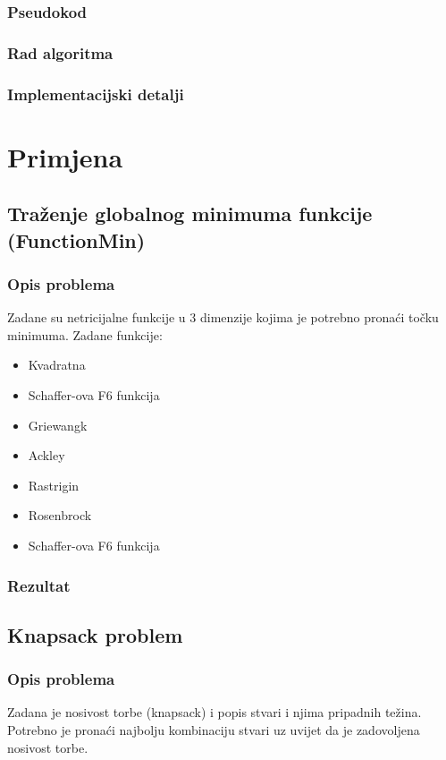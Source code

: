\documentclass[times, utf8, zavrsni]{fer}
\begin{document}
\subsection{Pseudokod}
\subsection{Rad algoritma}
\subsection{Implementacijski detalji}


\newpage

\chapter{Primjena}
\section{Traženje globalnog minimuma funkcije (FunctionMin)}
\subsection{Opis problema}
Zadane su netricijalne funkcije u 3 dimenzije kojima je potrebno pronaći točku minimuma.
Zadane funkcije:
\begin{itemize}
\item Kvadratna
\item Schaffer-ova F6 funkcija
\item Griewangk
\item Ackley
\item Rastrigin
\item Rosenbrock
\item Schaffer-ova F6 funkcija
\end{itemize}

\subsection{Rezultat}

\section{Knapsack problem}
\subsection{Opis problema}
Zadana je nosivost torbe (knapsack) i popis stvari i njima pripadnih težina.
Potrebno je pronaći najbolju kombinaciju stvari uz uvijet da je zadovoljena nosivost torbe.
\end{document}
